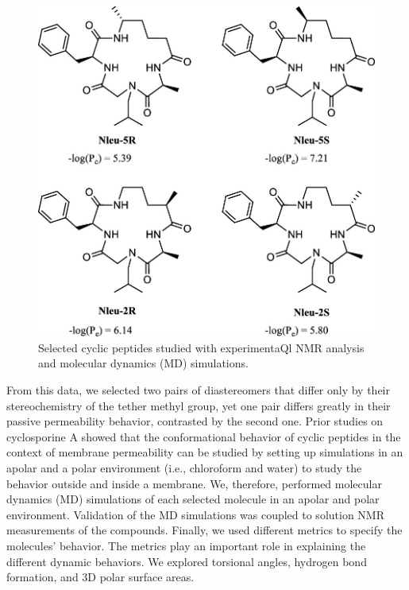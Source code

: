 %
\begin{figure}
    \centering
    \includegraphics[width=\textwidth]{7_chapter_5/fig/intro/permCliffMols.jpeg}
    \caption{Selected cyclic peptides studied with experimentaQl NMR analysis and molecular dynamics (MD) simulations.}
    \label{fig:permCMols}
\end{figure}
From this data, we selected two pairs of diastereomers that differ only by their stereochemistry of the tether methyl group, yet one pair differs greatly in their passive permeability behavior, contrasted by the second one. 
Prior studies on cyclosporine A showed that the conformational behavior of cyclic peptides in the context of membrane permeability can be studied by setting up simulations in an apolar and a polar environment (i.e., chloroform and water) to study the behavior outside and inside a membrane. \cite{Witek2016,Witek2017, Witek2019, Wang2021}
We, therefore, performed molecular dynamics (MD) simulations of each selected molecule in an apolar and polar environment. Validation of the MD simulations was coupled to solution NMR measurements of the compounds. \cite{Balazs2019}
Finally, we used different metrics to specify the molecules' behavior. The metrics play an important role in explaining the different dynamic behaviors. We explored torsional angles, hydrogen bond formation, and 3D polar surface areas. \cite{Sebastiano2018} 